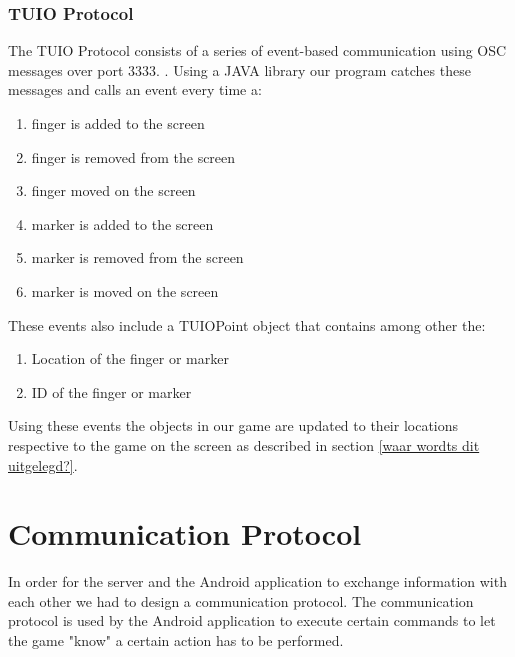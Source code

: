 \documentclass[a4paper,10pt]{article}
\begin{document}
			\subsubsection{TUIO Protocol}
			\label{sec:tuioprotocol}
			The TUIO Protocol consists of a series of event-based communication using OSC messages over port 3333. \cite{tuioProtocol}. 
			Using a JAVA library our program catches these messages and calls an event every time a:
			\begin{enumerate}
				\item finger is added to the screen
				\item finger is removed from the screen
				\item finger moved on the screen
				\item marker is added to the screen
				\item marker is removed from the screen
				\item marker is moved on the screen
			\end{enumerate}
			These events also include a TUIOPoint object that contains among other the:
			\begin{enumerate}
				\item Location of the finger or marker
				\item ID of the finger or marker
			\end{enumerate}
			Using these events the objects in our game are updated to their locations respective to the game on the screen as described in section \ref{waar wordts dit uitgelegd?}.
		
\section{Communication Protocol}
\label{sec:communication-protocol}
In order for the server and the Android application to exchange information with each other we had to design a communication protocol.
The communication protocol is used by the Android application to execute certain commands to let the game "know" a certain action has to be performed.
\end{document}
